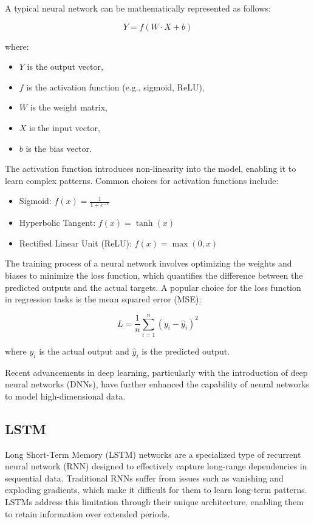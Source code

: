 \documentclass[a4paper,12pt]{article}
\begin{document}
A typical neural network can be mathematically represented as follows:

\begin{equation}
Y = f(W \cdot X + b)
\end{equation}

where:
\begin{itemize}
    \item \(Y\) is the output vector,
    \item \(f\) is the activation function (e.g., sigmoid, ReLU),
    \item \(W\) is the weight matrix,
    \item \(X\) is the input vector,
    \item \(b\) is the bias vector.
\end{itemize}

The activation function introduces non-linearity into the model, enabling it to learn complex patterns. Common choices for activation functions include:

\begin{itemize}
    \item Sigmoid: \(f(x) = \frac{1}{1 + e^{-x}}\)
    \item Hyperbolic Tangent: \(f(x) = \tanh(x)\)
    \item Rectified Linear Unit (ReLU): \(f(x) = \max(0, x)\)
\end{itemize}

The training process of a neural network involves optimizing the weights and biases to minimize the loss function, which quantifies the difference between the predicted outputs and the actual targets. A popular choice for the loss function in regression tasks is the mean squared error (MSE):

\begin{equation}
L = \frac{1}{n} \sum_{i=1}^{n} (y_i - \hat{y}_i)^2
\end{equation}

where \(y_i\) is the actual output and \(\hat{y}_i\) is the predicted output.

Recent advancements in deep learning, particularly with the introduction of deep neural networks (DNNs), have further enhanced the capability of neural networks to model high-dimensional data.

\subsection{LSTM}

Long Short-Term Memory (LSTM) networks are a specialized type of recurrent neural network (RNN) designed to effectively capture long-range dependencies in sequential data. Traditional RNNs suffer from issues such as vanishing and exploding gradients, which make it difficult for them to learn long-term patterns. LSTMs address this limitation through their unique architecture, enabling them to retain information over extended periods.
\end{document}
